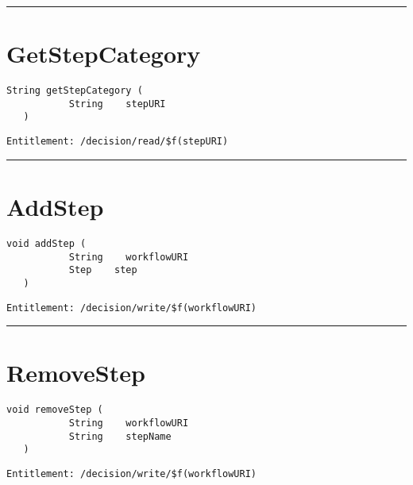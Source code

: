 \rule{12cm}{2pt}
\section{GetStepCategory}
\label{Api:GetStepCategory}
\begin{lstlisting}[style=nonumbers]
   String getStepCategory (
           String    stepURI
   )
\end{lstlisting}
\begin{Verbatim}[formatcom=\color{Maroon}]
  Entitlement: /decision/read/$f(stepURI)
\end{Verbatim}



\rule{12cm}{2pt}
\section{AddStep}
\label{Api:AddStep}
\begin{lstlisting}[style=nonumbers]
   void addStep (
           String    workflowURI
           Step    step
   )
\end{lstlisting}
\begin{Verbatim}[formatcom=\color{Maroon}]
  Entitlement: /decision/write/$f(workflowURI)
\end{Verbatim}



\rule{12cm}{2pt}
\section{RemoveStep}
\label{Api:RemoveStep}
\begin{lstlisting}[style=nonumbers]
   void removeStep (
           String    workflowURI
           String    stepName
   )
\end{lstlisting}
\begin{Verbatim}[formatcom=\color{Maroon}]
  Entitlement: /decision/write/$f(workflowURI)
\end{Verbatim}



